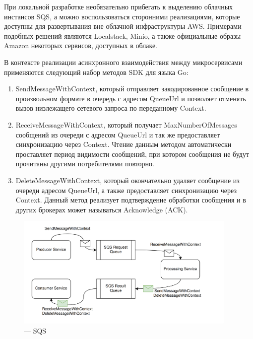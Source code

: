 При локальной разработке необязательно прибегать к выделению облачных инстансов SQS, а можно воспользоваться сторонними реализациями, которые доступны для развертывания вне облачной инфраструктуры AWS. Примерами подобных решений являются Localstack, Minio, а также официальные образы Amazon
некоторых сервисов, доступных в облаке.

В контексте реализации асинхронного взаимодействия между микросервисами применяются следующий набор методов SDK для языка Go:
\begin{enumerate}
    \item SendMessageWithContext, который отправляет закодированное сообщение в произвольном формате в очередь с адресом QueueUrl и позволяет отменять вызов низлежащего сетевого запроса по переданному Context.
    \item ReceiveMessageWithContext, который получает MaxNumberOfMessages сообщений из очереди с адресом QueueUrl и так же предоставляет синхронизацию через Context.
    Чтение данным методом автоматически проставляет период видимости сообщений, при котором сообщения не будут прочитаны другими 
    потребителями повторно.
    \item DeleteMessageWithContext, который окончательно удаляет сообщение из очереди адресом QueueUrl, а также предоставляет синхронизацию через Context.
     Данный метод реализует подтверждение обработки сообщения и в других 
    брокерах может называться Acknowledge (ACK).
\end{enumerate}

\begin{figure}[H]
  \centering
  \includegraphics[width=0.95\textwidth]{img/sqs.png}
  \caption{--- SQS}
    \label{fig:sqs}
\end{figure}

